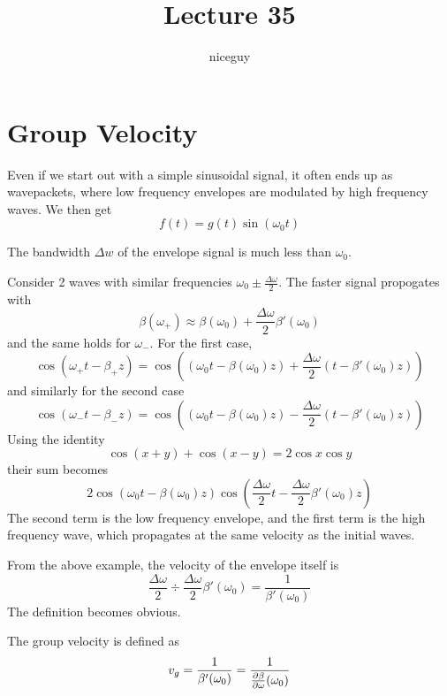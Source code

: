 \documentclass[12pt]{article}
\title{Lecture 35}
\author{niceguy}
\begin{document}
\maketitle

\section{Group Velocity}

Even if we start out with a simple sinusoidal signal, it often ends up as wavepackets, where low frequency envelopes are modulated by high frequency waves. We then get
$$f(t) = g(t)\sin(\omega_0t)$$

The bandwidth $\Delta w$ of the envelope signal is much less than $\omega_0$.

\begin{ex}
    Consider 2 waves with similar frequencies $\omega_0 \pm \frac{\Delta\omega}{2}$. The faster signal propogates with
    $$\beta(\omega_+) \approx \beta(\omega_0) + \frac{\Delta\omega}{2} \beta'(\omega_0)$$
    and the same holds for $\omega_-$. For the first case,
    $$\cos(\omega_+t - \beta_+z) = \cos\left((\omega_0t - \beta(\omega_0)z) + \frac{\Delta\omega}{2}(t - \beta'(\omega_0)z)\right)$$
    and similarly for the second case
    $$\cos(\omega_-t - \beta_-z) = \cos\left((\omega_0t - \beta(\omega_0)z) - \frac{\Delta\omega}{2}(t - \beta'(\omega_0)z)\right)$$
    Using the identity
    $$\cos(x+y) + \cos(x-y) = 2\cos x\cos y$$
    their sum becomes
    $$2\cos(\omega_0t - \beta(\omega_0)z)\cos\left(\frac{\Delta\omega}{2}t - \frac{\Delta\omega}{2}\beta'(\omega_0)z\right)$$
    The second term is the low frequency envelope, and the first term is the high frequency wave, which propagates at the same velocity as the initial waves.
\end{ex}

From the above example, the velocity of the envelope itself is
$$\frac{\Delta\omega}{2} \div \frac{\Delta\omega}{2}\beta'(\omega_0) = \frac{1}{\beta'(\omega_0)}$$
The definition becomes obvious.

\begin{defn}
    The group velocity is defined as
    $$v_g = \frac{1}{\beta'(\omega_0)} = \frac{1}{\frac{\partial \beta}{\partial \omega}(\omega_0)}$$
\end{defn}
\end{document}
